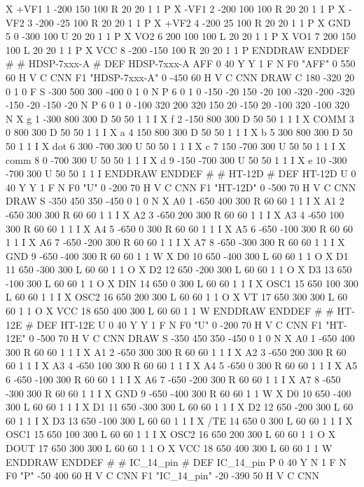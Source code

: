 X +VF1 1 -200 150 100 R 20 20 1 1 P
X -VF1 2 -200 100 100 R 20 20 1 1 P
X -VF2 3 -200 -25 100 R 20 20 1 1 P
X +VF2 4 -200 25 100 R 20 20 1 1 P
X GND 5 0 -300 100 U 20 20 1 1 P
X VO2 6 200 100 100 L 20 20 1 1 P
X VO1 7 200 150 100 L 20 20 1 1 P
X VCC 8 -200 -150 100 R 20 20 1 1 P
ENDDRAW
ENDDEF
#
# HDSP-7xxx-A
#
DEF HDSP-7xxx-A AFF 0 40 Y Y 1 F N
F0 "AFF" 0 550 60 H V C CNN
F1 "HDSP-7xxx-A" 0 -450 60 H V C CNN
DRAW
C 180 -320 20 0 1 0 F
S -300 500 300 -400 0 1 0 N
P 6 0 1 0  -150 -20  150 -20  100 -320  -200 -320  -150 -20  -150 -20 N
P 6 0 1 0  -100 320  200 320  150 20  -150 20  -100 320  -100 320 N
X g 1 -300 800 300 D 50 50 1 1 I
X f 2 -150 800 300 D 50 50 1 1 I
X COMM 3 0 800 300 D 50 50 1 1 I
X a 4 150 800 300 D 50 50 1 1 I
X b 5 300 800 300 D 50 50 1 1 I
X dot 6 300 -700 300 U 50 50 1 1 I
X c 7 150 -700 300 U 50 50 1 1 I
X comm 8 0 -700 300 U 50 50 1 1 I
X d 9 -150 -700 300 U 50 50 1 1 I
X e 10 -300 -700 300 U 50 50 1 1 I
ENDDRAW
ENDDEF
#
# HT-12D
#
DEF HT-12D U 0 40 Y Y 1 F N
F0 "U" 0 -200 70 H V C CNN
F1 "HT-12D" 0 -500 70 H V C CNN
DRAW
S -350 450 350 -450 0 1 0 N
X A0 1 -650 400 300 R 60 60 1 1 I
X A1 2 -650 300 300 R 60 60 1 1 I
X A2 3 -650 200 300 R 60 60 1 1 I
X A3 4 -650 100 300 R 60 60 1 1 I
X A4 5 -650 0 300 R 60 60 1 1 I
X A5 6 -650 -100 300 R 60 60 1 1 I
X A6 7 -650 -200 300 R 60 60 1 1 I
X A7 8 -650 -300 300 R 60 60 1 1 I
X GND 9 -650 -400 300 R 60 60 1 1 W
X D0 10 650 -400 300 L 60 60 1 1 O
X D1 11 650 -300 300 L 60 60 1 1 O
X D2 12 650 -200 300 L 60 60 1 1 O
X D3 13 650 -100 300 L 60 60 1 1 O
X DIN 14 650 0 300 L 60 60 1 1 I
X OSC1 15 650 100 300 L 60 60 1 1 I
X OSC2 16 650 200 300 L 60 60 1 1 O
X VT 17 650 300 300 L 60 60 1 1 O
X VCC 18 650 400 300 L 60 60 1 1 W
ENDDRAW
ENDDEF
#
# HT-12E
#
DEF HT-12E U 0 40 Y Y 1 F N
F0 "U" 0 -200 70 H V C CNN
F1 "HT-12E" 0 -500 70 H V C CNN
DRAW
S -350 450 350 -450 0 1 0 N
X A0 1 -650 400 300 R 60 60 1 1 I
X A1 2 -650 300 300 R 60 60 1 1 I
X A2 3 -650 200 300 R 60 60 1 1 I
X A3 4 -650 100 300 R 60 60 1 1 I
X A4 5 -650 0 300 R 60 60 1 1 I
X A5 6 -650 -100 300 R 60 60 1 1 I
X A6 7 -650 -200 300 R 60 60 1 1 I
X A7 8 -650 -300 300 R 60 60 1 1 I
X GND 9 -650 -400 300 R 60 60 1 1 W
X D0 10 650 -400 300 L 60 60 1 1 I
X D1 11 650 -300 300 L 60 60 1 1 I
X D2 12 650 -200 300 L 60 60 1 1 I
X D3 13 650 -100 300 L 60 60 1 1 I
X /TE 14 650 0 300 L 60 60 1 1 I
X OSC1 15 650 100 300 L 60 60 1 1 I
X OSC2 16 650 200 300 L 60 60 1 1 O
X DOUT 17 650 300 300 L 60 60 1 1 O
X VCC 18 650 400 300 L 60 60 1 1 W
ENDDRAW
ENDDEF
#
# IC_14_pin
#
DEF IC_14_pin P 0 40 Y N 1 F N
F0 "P" -50 400 60 H V C CNN
F1 "IC_14_pin" -20 -390 50 H V C CNN
